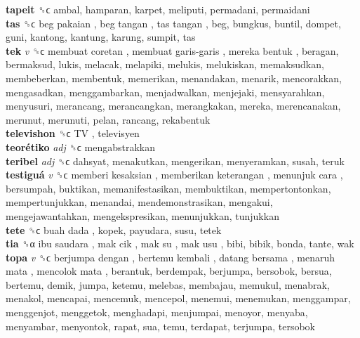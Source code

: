 \textbf{tapeit} ␝ϲ  ambal, hamparan, karpet, meliputi, permadani, permaidani  \\
\textbf{tas} ␝ϲ   beg pakaian ,  beg tangan ,  tas tangan , beg, bungkus, buntil, dompet, guni, kantong, kantung, karung, sumpit, tas  \\
\textbf{tek} \emph{v}  ␝ϲ   membuat coretan ,  membuat garis-garis ,  mereka bentuk , beragan, bermaksud, lukis, melacak, melapiki, melukis, melukiskan, memaksudkan, membeberkan, membentuk, memerikan, menandakan, menarik, mencorakkan, mengasadkan, menggambarkan, menjadwalkan, menjejaki, mensyarahkan, menyusuri, merancang, merancangkan, merangkakan, mereka, merencanakan, merunut, merunuti, pelan, rancang, rekabentuk  \\
\textbf{televishon} ␝ϲ   TV , televisyen  \\
\textbf{teorétiko} \emph{adj}  ␝ϲ  mengabstrakkan  \\
\textbf{teribel} \emph{adj}  ␝ϲ  dahsyat, menakutkan, mengerikan, menyeramkan, susah, teruk  \\
\textbf{testiguá} \emph{v}  ␝ϲ   memberi kesaksian ,  memberikan keterangan ,  menunjuk cara , bersumpah, buktikan, memanifestasikan, membuktikan, mempertontonkan, mempertunjukkan, menandai, mendemonstrasikan, mengakui, mengejawantahkan, mengekspresikan, menunjukkan, tunjukkan  \\
\textbf{tete} ␝ϲ   buah dada , kopek, payudara, susu, tetek  \\
\textbf{tia} ␝α   ibu saudara ,  mak cik ,  mak su ,  mak usu , bibi, bibik, bonda, tante, wak  \\
\textbf{topa} \emph{v}  ␝ϲ   berjumpa dengan ,  bertemu kembali ,  datang bersama ,  menaruh mata ,  mencolok mata , berantuk, berdempak, berjumpa, bersobok, bersua, bertemu, demik, jumpa, ketemu, melebas, membajau, memukul, menabrak, menakol, mencapai, mencemuk, mencepol, menemui, menemukan, menggampar, menggenjot, menggetok, menghadapi, menjumpai, menoyor, menyaba, menyambar, menyontok, rapat, sua, temu, terdapat, terjumpa, tersobok  \\
